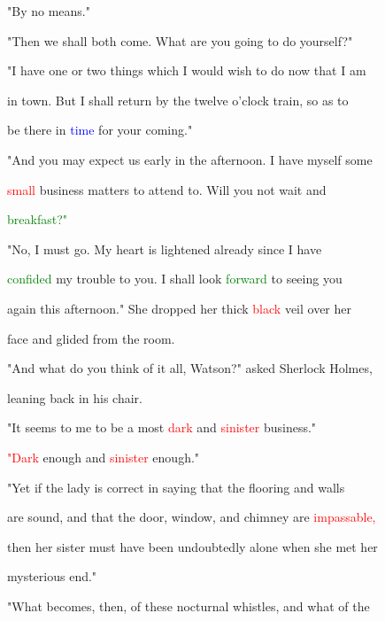  "By no means."



 "Then we shall both come. What are you going to do yourself?"



 "I have one or two things which I would wish to do now that I am

 in town. But I shall return by the twelve o'clock train, so as to

 be there in \textcolor{blue}{time} for your coming."



 "And you may \textcolor{BurntOrange}{expect} us early in the afternoon. I have myself some

 \textcolor{red}{small} business matters to attend to. Will you not \textcolor{BurntOrange}{wait} and

 \textcolor{green}{breakfast?"}



 "No, I must go. My heart is lightened already since I have

 \textcolor{green}{confided} my trouble to you. I shall look \textcolor{green}{forward} to seeing you

 again this afternoon." She dropped her thick \textcolor{red}{black} veil over her

 face and \textcolor{BurntOrange}{glided} from the room.



 "And what do you think of it all, Watson?" asked Sherlock Holmes,

 leaning back in his chair.



 "It seems to me to be a most \textcolor{red}{dark} and \textcolor{red}{sinister} business."



 \textcolor{red}{"Dark} enough and \textcolor{red}{sinister} enough."



 "Yet if the lady is correct in saying that the flooring and walls

 are sound, and that the door, window, and chimney are \textcolor{red}{impassable,}

 then her sister must have been undoubtedly alone when she met her

 \textcolor{BurntOrange}{mysterious} end."



 "What becomes, then, of these nocturnal whistles, and what of the


